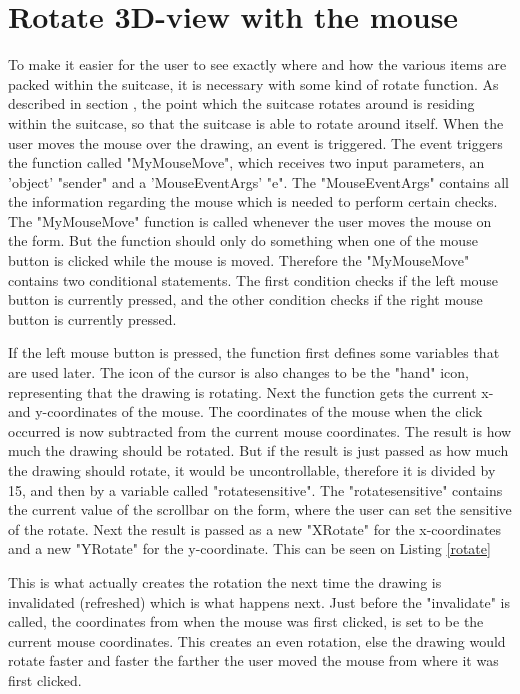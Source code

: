 \section{Rotate 3D-view with the mouse}

To make it easier for the user to see exactly where and how the various items are packed within the suitcase, it is necessary with some kind of rotate function. As described in section , the point which the suitcase rotates around is residing within the suitcase, so that the suitcase is able to rotate around itself. When the user moves the mouse over the drawing, an event is triggered. The event triggers the function called "MyMouseMove", which receives two input parameters, an 'object' "sender" and a 'MouseEventArgs' "e". The "MouseEventArgs" contains all the information regarding the mouse which is needed to perform certain checks. The "MyMouseMove" function is called whenever the user moves the mouse on the form. But the function should only do something when one of the mouse button is clicked while the mouse is moved. Therefore the "MyMouseMove" contains two conditional statements. The first condition checks if the left mouse button is currently pressed, and the other condition checks if the right mouse button is currently pressed.

If the left mouse button is pressed, the function first defines some variables that are used later. The icon of the cursor is also changes to be the "hand" icon, representing that the drawing is rotating. Next the function gets the current x- and y-coordinates of the mouse. The coordinates of the mouse when the click occurred is now subtracted from the current mouse coordinates. The result is how much the drawing should be rotated. But if the result is just passed as how much the drawing should rotate, it would be uncontrollable, therefore it is divided by 15, and then by a variable called "rotatesensitive". The "rotatesensitive" contains the current value of the scrollbar on the form, where the user can set the sensitive of the rotate. Next the result is passed as a new "XRotate" for the x-coordinates and a new "YRotate" for the y-coordinate. This can be seen on Listing \ref{rotate}


This is what actually creates the rotation the next time the drawing is invalidated (refreshed) which is what happens next. Just before the "invalidate" is called, the coordinates from when the mouse was first clicked, is set to be the current mouse coordinates. This creates an even rotation, else the drawing would rotate faster and faster the farther the user moved the mouse from where it was first clicked. 